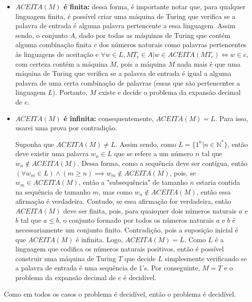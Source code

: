 \documentclass{article}
\begin{document}
{\begin{itemize}
      \begin{itemize}
        \item \textbf{$ACEITA(M)$ é finita:} dessa forma, é importante notar que, para qualquer linguagem finita, é possível criar uma máquina de Turing que verifica se a palavra de entrada é alguma palavra pertencente a essa linguagem. Assim sendo, o conjunto $A$, dado por todas as máquinas de Turing que contém alguma combinação finita $c$ dos números naturais como palavras pertencentes às linguagens de aceitação e $\forall w \in L, MT_c \in A| w \in ACEITA(MT_c) \iff w \in c$, com certeza contém a máquina $M$, pois a máquina $M$ nada mais é que uma máquina de Turing que verifica se a palavra de entrada é igual a alguma palavra de uma certa combinação de palavras (essas que são pertencentes a linguagem $L$). Portanto, $M$ existe e decide o problema da expansão decimal de $e$.
        \item \textbf{$ACEITA(M)$ é infinita:} consequentemente, $ACEITA(M) = L$. Para isso, usarei uma prova por contradição.
        \par Suponha que $ACEITA(M) \neq L$. Assim sendo, como $L = \{ 1^n|n\in\mathds{N}^*\}$, então deve existir uma palavra $w_n \in L$ que se refere a um número $n$ tal que $w_n \notin ACEITA(M)$. Dessa forma, como a sequência deve ser contígua, então $(\forall w_m \in L) \land (m \geq n) \implies w_m \notin ACEITA(M)$, pois, se $w_m \in ACEITA(M)$, então a "subsequência" de tamanho $n$ estaria contida na sequência de tamanho $m$, mas como $w_n \notin ACEITA(M)$, então essa afirmação é verdadeira. Contudo, se essa afirmação for verdadeira, então $ACEITA(M)$ deve ser finita, pois, para quaisquer dois números naturais $a$ e $b$ tal que $a \le b$, o conjunto formado por todos os números naturais $a$ e $b$ é necessariamente um conjunto finito. Contradição, pois a suposição inicial é que $ACEITA(M)$ é infinita. Logo, $ACEITA(M) = L$. Como $L$ é a linguagem que codifica os números naturais positivos, então é possível construir uma máquina de Turing $T$ que decide $L$ simplesmente verificando se a palavra de entrada é uma sequência de 1's. Por conseguinte, $M = T$ e o problema da expansão decimal de $e$ é decidível.
      \end{itemize}
      \par Como em todos os casos o problema é decidível, então o problema é decidível.
  \end{itemize}
}
\end{document}
